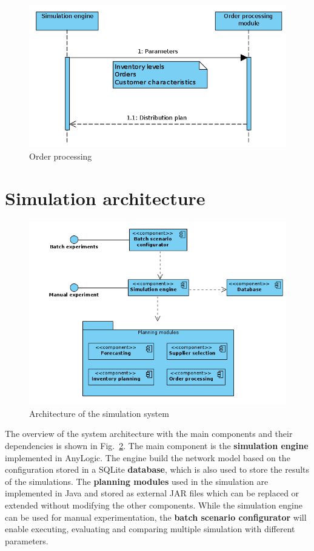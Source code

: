 \documentclass{article}
\begin{document}
\begin{figure}[ht!]
	\center
	\includegraphics[width=.7\textwidth]{seq_dispatching.png} 
	\caption{Order processing}\label{fig:seq_dispatching}
\end{figure}


\section{Simulation architecture}

\begin{figure}[ht!]
	\center
	\includegraphics[width=\textwidth]{architecture.png} 
	\caption{Architecture of the simulation system}\label{fig:architecture}
\end{figure}

The overview of the system architecture with the main components and their dependencies is shown in Fig.~\ref{fig:architecture}. The main component is the \textbf{simulation engine} implemented in AnyLogic. The engine build the network model based on the configuration stored in a SQLite \textbf{database}, which is also used to store the results of the simulations. The \textbf{planning modules} used in the simulation are implemented in Java and stored as external JAR files which can be replaced or extended without modifying the other components. While the simulation engine can be used for manual experimentation, the \textbf{batch scenario configurator} will enable executing, evaluating and comparing multiple simulation with different parameters.
\end{document}
